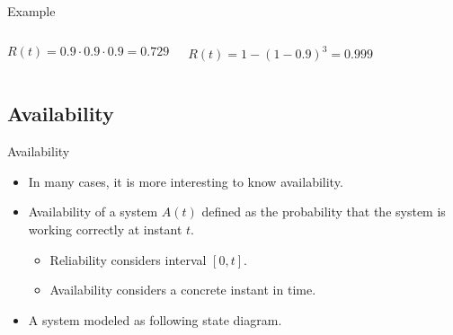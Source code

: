 \begin{frame}[t]{Example}
\begin{center}

\end{center}

\begin{columns}[T]







\end{columns}

\begin{columns}[T]


\begin{equation*}
R(t) = 0.9 \cdot 0.9 \cdot 0.9 = 0.729
\end{equation*}


\begin{equation*}
R(t) = 1 - (1 - 0.9)^3 = 0.999
\end{equation*}

\end{columns}

\end{frame}

\subsection{Availability}

\begin{frame}[t]{Availability}
\begin{itemize}
  \item In many cases, it is more interesting to know availability.
  \item Availability of a system $A(t)$ defined as the
        probability that the system is working correctly at instant $t$.
    \begin{itemize}
      \item Reliability considers interval $[0,t]$.
      \item Availability considers a concrete instant in time.
    \end{itemize}
  \item A system modeled as following state diagram.
\end{itemize}
\begin{center}



\end{center}
\end{frame}

